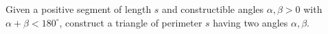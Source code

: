 Given a positive segment of length $s$ and constructible angles $\alpha,\beta>0$ with $\alpha+\beta<180^\circ$, construct a triangle of perimeter $s$ having two angles $\alpha,\beta$.
